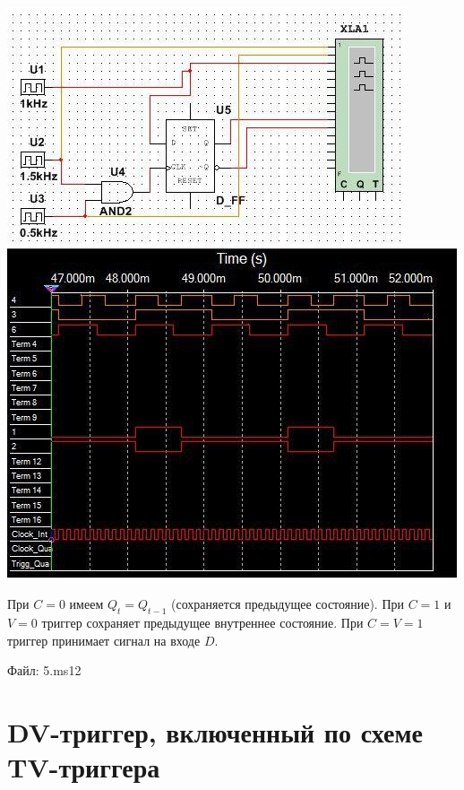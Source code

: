 \documentclass[a4paper,12pt]{article}
\begin{document}
\begin{center}
	
\includegraphics[scale=1]{../screens/5.jpg} \newline\newline
\includegraphics[scale=1]{../screens/5_1.jpg} \newline\newline

\end{center}

\noindent При $C = 0$ имеем $Q_{t} = Q_{t - 1}$ (сохраняется предыдущее состояние). При $C = 1 $ и $V = 0$ триггер сохраняет предыдущее внутреннее состояние. При $C = V = 1$ триггер принимает сигнал на входе $D$.\newline

\noindent Файл: 5.ms12


\section{DV-триггер, включенный по схеме TV-триггера}
\end{document}
